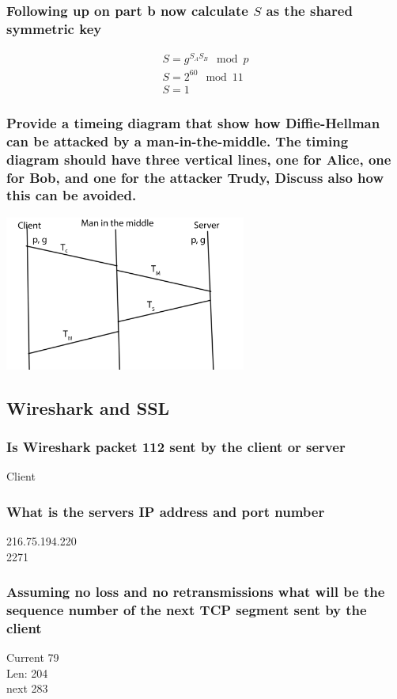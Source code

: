 \documentclass[12pt, a4paper]{article}
\begin{document}
			\subsubsection{Following up on part b now calculate $S$ as the shared symmetric key}
				\begin{align*}
					S=g^{S_AS_B}\mod p\\
					S=2^60\mod 11\\
					S=1
				\end{align*}
			\subsubsection{Provide a timeing diagram that show how Diffie-Hellman can be attacked by a man-in-the-middle. The timing diagram should have three vertical lines, one for Alice, one for Bob, and one for the attacker Trudy, Discuss also how this can be avoided.}
				\includegraphics[width=300px]{assets/DiffieHellman.png}
		\subsection{Wireshark and SSL}
			\subsubsection{Is Wireshark packet 112 sent by the client or server}
				Client
			\subsubsection{What is the servers IP address and port number}
				216.75.194.220\\
				2271
			\subsubsection{Assuming no loss and no retransmissions what will be the sequence number of the next TCP segment sent by the client}
				Current 79\\
				Len: 204\\
				next 283
\end{document}
